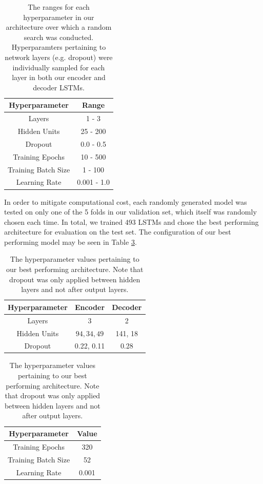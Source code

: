 \documentclass[letterpaper, 12 pt, conference]{ieeeconf}
\begin{document}
\begin{table}[h]
\center
\begin{tabular}{|c|c|}
\hline
\textbf{Hyperparameter} & \textbf{Range} \\
\hline
Layers & 1 - 3 \\
\hline
Hidden Units & 25 - 200 \\ 
\hline
Dropout  & 0.0 - 0.5 \\
\hline
Training Epochs & 10 - 500 \\
\hline
Training Batch Size & 1 - 100 \\
\hline
Learning Rate & 0.001 - 1.0 \\
\hline
\end{tabular}
\caption{The ranges for each hyperparameter in our architecture over which a random search was conducted. Hyperparamters pertaining to network layers (e.g. dropout) were individually sampled for each layer in both our encoder and decoder LSTMs.}\label{fig:hyperparameter_ranges}
\end{table}

In order to mitigate computational cost, each randomly generated model was tested on only one of the 5 folds in our validation set, which itself was randomly chosen each time. In total, we trained 493 LSTMs and chose the best performing architecture for evaluation on the test set. The configuration of our best performing model may be seen in Table \ref{fig:hyperparameter_choice}.

\begin{table}[h]
\center
\begin{tabular}{|c|c|c|}
\hline
\textbf{Hyperparameter} & \textbf{Encoder} & \textbf{Decoder} \\
\hline
Layers & 3 & 2\\
\hline
Hidden Units & $94,34,49$ & 141, 18\\ 
\hline
Dropout  & 0.22, 0.11 & 0.28 \\
\hline
\end{tabular}
\begin{tabular}{|c|c|}
\hline
\textbf{Hyperparameter} & \textbf{Value} \\
\hline
Training Epochs & 320 \\
\hline
Training Batch Size & 52\\
\hline
Learning Rate & 0.001\\
\hline
\end{tabular}
\caption{The hyperparameter values pertaining to our best performing architecture. Note that dropout was only applied between hidden layers and not after output layers.}\label{fig:hyperparameter_choice}
\end{table}
\end{document}
